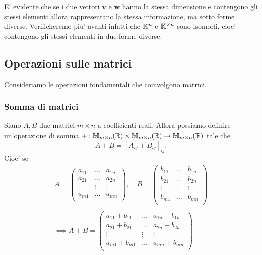 E' evidente che se i due vettori $\bm{v}$ e $\bm{w}$ hanno la stessa dimensione e contengono gli stessi elementi allora rappresentano la stessa informazione, ma sotto forme diverse. Verificheremo piu' avanti infatti che $\mathbb{K}^n$ e $\mathbb{K}^{\times n}$ sono isomorfi, cioe' contengono gli stessi elementi in due forme diverse.

\subsection{Operazioni sulle matrici}

Consideriamo le operazioni fondamentali che coinvolgono matrici.

\subsubsection{Somma di matrici}

Siano $A, B$ due matrici $m \times n$ a coefficienti reali. Allora possiamo definire un'operazione di somma $+ : \mathbb{M}_{m \times n}(\mathbb{R}) \times \mathbb{M}_{m \times n}(\mathbb{R}) \to \mathbb{M}_{m \times n}(\mathbb{R})$ tale che \begin{equation}
    A + B = [A_{ij} + B_{ij}]_{ij}.
\end{equation}
Cioe' se \begin{gather*}
    A = \begin{pmatrix}
        a_{11}  & \dots     & a_{1n} \\
        a_{21}  & \dots     & a_{2n} \\
        \vdots  & \vdots    & \vdots \\
        a_{m1}  & \dots     & a_{mn} \\
    \end{pmatrix},\quad
    B = \begin{pmatrix}
        b_{11}  & \dots     & b_{1n} \\
        b_{21}  & \dots     & b_{2n} \\
        \vdots  & \vdots    & \vdots \\
        b_{m1}  & \dots     & b_{mn} \\
    \end{pmatrix} \\
    \\
    \implies
    A + B = \begin{pmatrix}
        a_{11} + b_{11}  & \dots     & a_{1n} + b_{1n} \\
        a_{21} + b_{21}  & \dots     & a_{2n} + b_{2n} \\
        \vdots           & \vdots    & \vdots          \\
        a_{m1} + b_{m1}  & \dots     & a_{mn} + b_{mn} \\
    \end{pmatrix}   
\end{gather*}